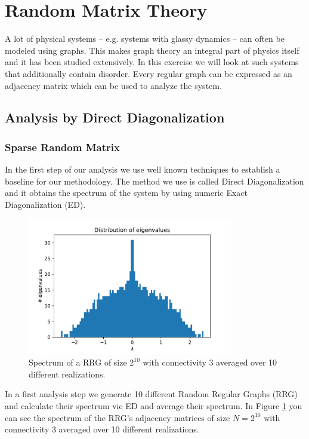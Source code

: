 \documentclass[../main.tex]{subfiles}
\begin{document}
\section{Random Matrix Theory}
A lot of physical systems -- e.g. systems with glassy dynamics -- can often be modeled using graphs.
This makes graph theory an integral part of physics itself and it has been studied extensively.
In this exercise we will look at such systems that additionally contain disorder. 
Every regular graph can be expressed as an adjacency matrix which can be used to analyze the system.
\par

\subsection{Analysis by Direct Diagonalization}

\subsubsection{Sparse Random Matrix}
In the first step of our analysis we use well known techniques to establish a baseline for our methodology.
The method we use is called Direct Diagonalization and it obtains the spectrum of the system by using numeric Exact Diagonalization (ED).
\par 

\begin{figure}[htpb]
    \centering
    \includegraphics[width=0.8\textwidth]{../figures/2_1_1_spectrum_sparse.pdf}
    \caption{Spectrum of a RRG of size $2^{10}$ with connectivity 3 averaged over 10 different realizations.}
    \label{fig:spectrum_sparse}
\end{figure}

In a first analysis step we generate 10 different Random Regular Graphs (RRG) and calculate their spectrum vie ED and average their spectrum.
In Figure \ref{fig:spectrum_sparse} you can see the spectrum of the RRG's adjacency matrices of size $N = 2^{10}$ with connectivity 3 averaged over 10 different realizations.
\end{document}
